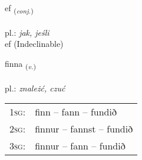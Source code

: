 \documentclass[frontgrid, backgrid]{flacards}\usepackage[]{graphicx}\usepackage[]{xcolor}
\begin{document}
\renewcommand{\blhead}{\vskip5pt {\small\bfseries\footnotesize Samtenging | Conjuction }}
\renewcommand{\bcfoot}{\vskip5pt \hspace{2pt}{\small\bfseries\footnotesize 1K}}


{ef \small{\textsubscript{(\textit{conj.})}} \\[1ex]
\textphonetic{[ɛːf]} \\
pl.: \emph{jak, jeśli} \\  [2ex]
ef (Indeclinable)}

\renewcommand{\flhead}{\vskip5pt \fboxsep=0pt {\small\bfseries\footnotesize Sagnorð | Verb}}
\renewcommand{\fcfoot}{\vskip5pt \fboxsep=0pt \hspace{2pt}{\small\bfseries\footnotesize 1K}}

\renewcommand{\blhead}{\vskip5pt {\small\bfseries\footnotesize Sagnorð | Verb }}
\renewcommand{\bcfoot}{\vskip5pt \hspace{2pt}{\small\bfseries\footnotesize 1K}}


{finna \small{\textsubscript{(\textit{v.})}} \\[1ex] %
\textphonetic{[fɪna]} \\
pl.: \emph{znależć, czuć} \\  [2ex]
\renewcommand*{\arraystretch}{0.8}
\begin{tabular}{p{1cm}l}
\textsc{1sg}: & finn -- fann -- fundið \\ 
\textsc{2sg}: & finnur -- fannst -- fundið \\ 
\textsc{3sg}: & finnur -- fann -- fundið \\ 
\end{tabular}
}


\renewcommand{\flhead}{\vskip5pt \fboxsep=0pt {\small\bfseries\footnotesize Forsetning | Preposition}}
\renewcommand{\fcfoot}{\vskip5pt \fboxsep=0pt \hspace{2pt}{\small\bfseries\footnotesize 1K}}

\renewcommand{\blhead}{\vskip5pt {\small\bfseries\footnotesize Forsetning | Preposition }}
\renewcommand{\bcfoot}{\vskip5pt \hspace{2pt}{\small\bfseries\footnotesize 1K}}
\end{document}

